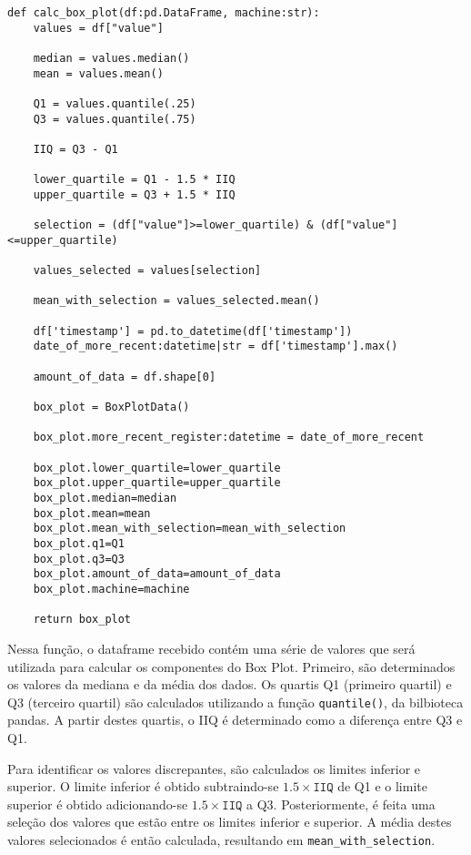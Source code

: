 \begin{verbatim}
def calc_box_plot(df:pd.DataFrame, machine:str):
    values = df["value"]

    median = values.median()
    mean = values.mean()

    Q1 = values.quantile(.25)
    Q3 = values.quantile(.75)

    IIQ = Q3 - Q1

    lower_quartile = Q1 - 1.5 * IIQ
    upper_quartile = Q3 + 1.5 * IIQ
    
    selection = (df["value"]>=lower_quartile) & (df["value"]<=upper_quartile)

    values_selected = values[selection]
    
    mean_with_selection = values_selected.mean()

    df['timestamp'] = pd.to_datetime(df['timestamp'])
    date_of_more_recent:datetime|str = df['timestamp'].max()

    amount_of_data = df.shape[0]

    box_plot = BoxPlotData()

    box_plot.more_recent_register:datetime = date_of_more_recent

    box_plot.lower_quartile=lower_quartile
    box_plot.upper_quartile=upper_quartile
    box_plot.median=median
    box_plot.mean=mean
    box_plot.mean_with_selection=mean_with_selection
    box_plot.q1=Q1
    box_plot.q3=Q3
    box_plot.amount_of_data=amount_of_data
    box_plot.machine=machine

    return box_plot
\end{verbatim}


Nessa função, o dataframe recebido contém uma série de valores que será utilizada para calcular os componentes do Box Plot. Primeiro, são determinados os valores da mediana e da média dos dados. Os quartis Q1 (primeiro quartil) e Q3 (terceiro quartil) são calculados utilizando a função \texttt{quantile()}, da bilbioteca pandas. A partir destes quartis, o IIQ é determinado como a diferença entre Q3 e Q1.

Para identificar os valores discrepantes, são calculados os limites inferior e superior. O limite inferior é obtido subtraindo-se \(1.5 \times \texttt{IIQ}\) de Q1 e o limite superior é obtido adicionando-se \(1.5 \times \texttt{IIQ}\) a Q3. Posteriormente, é feita uma seleção dos valores que estão entre os limites inferior e superior. A média destes valores selecionados é então calculada, resultando em \texttt{mean\_with\_selection}.

